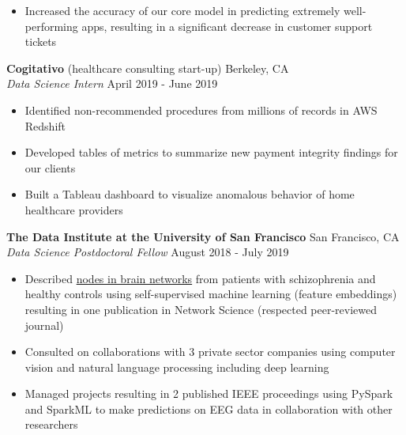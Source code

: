 \documentclass[line,margin,10pt]{res}
\begin{document}
\begin{resume}
\begin{itemize}
\item Increased the accuracy of our core model in predicting extremely well-performing apps, resulting in a significant decrease in customer support tickets
\end{itemize}
{\vspace{-0.25cm}}
\textbf{Cogitativo} (healthcare consulting start-up) \hfill Berkeley, CA\\
{\sl Data Science Intern} \hfill April 2019 - June 2019
\begin{itemize} \itemsep -2pt
\item Identified non-recommended procedures from millions of records in AWS Redshift
\item Developed tables of metrics to summarize new payment integrity findings for our clients
\item Built a Tableau dashboard to visualize anomalous behavior of home healthcare providers
\end{itemize}
{\vspace{-0.25cm}}
\textbf{The Data Institute at the University of San Francisco} \hfill San Francisco, CA \\
{\sl Data Science Postdoctoral Fellow} \hfill August 2018 - July 2019
\begin{itemize} \itemsep -2pt
\item Described \href{https://www.youtube.com/watch?v=8Ng_aMgIZLw&feature=youtu.be}{nodes in brain networks} from patients with schizophrenia and healthy controls using self-supervised machine learning (feature embeddings) resulting in one publication in Network Science (respected peer-reviewed journal)
\item Consulted on collaborations with 3 private sector companies using computer vision and natural language processing including deep learning
\item Managed projects resulting in 2 published IEEE proceedings using PySpark and SparkML to make predictions on EEG data in collaboration with other researchers

\end{itemize}
\end{resume}
\end{document}
